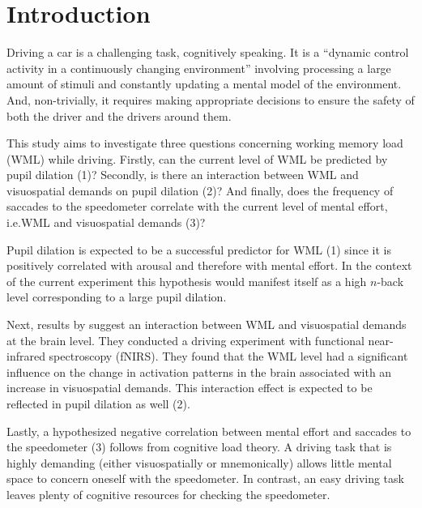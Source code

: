 
\section{Introduction}\label{sec:introduction}
Driving a car is a challenging task, cognitively speaking. 
It is a ``dynamic control activity in a continuously changing environment'' \citep[p.~18]{DeWaard1996} 
involving processing a large amount of stimuli and constantly updating a mental model of the environment.
And, non-trivially, it requires making appropriate decisions to ensure the safety of both the driver and the drivers around them.





This study aims to investigate three questions concerning working memory load (WML) while driving. 
Firstly, can the current level of WML be predicted by pupil dilation (1)? 
Secondly, is there an interaction between WML and visuospatial demands on pupil dilation (2)?
And finally, does the frequency of saccades to the speedometer correlate with the current level of mental effort, i.e.\@ WML and visuospatial demands (3)?

Pupil dilation is expected to be a successful predictor for WML (1) since it is positively correlated with arousal \citep{Mathot2018} and therefore with mental effort.
In the context of the current experiment this hypothesis would manifest itself as a high \(n\)-back level corresponding to a large pupil dilation.

Next, results by \citet{Scheunemann2019} suggest an interaction between WML and visuospatial demands at the brain level. 
They conducted a driving experiment with functional near-infrared spectroscopy (fNIRS).
They found that the WML level had a significant influence on the change in activation patterns in the brain associated with an increase in visuospatial demands.
This interaction effect is expected to be reflected in pupil dilation as well (2).

Lastly, a hypothesized negative correlation between mental effort and saccades to the speedometer (3) follows from cognitive load theory.
A driving task that is highly demanding (either visuospatially or mnemonically) allows little mental space to concern oneself with the speedometer.
In contrast, an easy driving task leaves plenty of cognitive resources for checking the speedometer.

